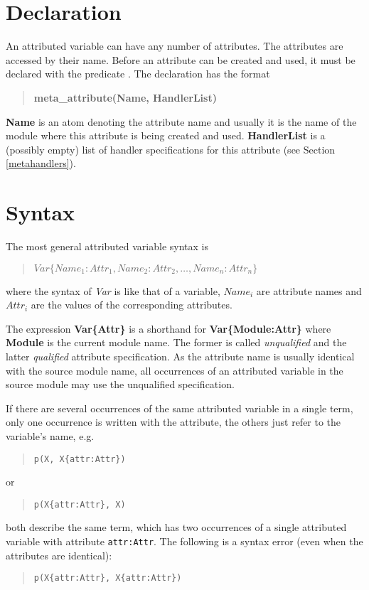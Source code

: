 \section{Declaration}
An attributed variable can have any number of attributes.
The attributes are accessed by their name.
Before an attribute can be created and used, it must be declared
with the predicate .
The declaration has the format
\begin{quote}
{\bf meta_attribute(Name, HandlerList)}
\end{quote}
{\bf Name} is an atom denoting the attribute name
and usually it is the name of the module where this attribute
is being created and used.
{\bf HandlerList} is a (possibly empty) list of handler specifications
for this attribute (see Section \ref{metahandlers}).

\section{Syntax}

{\samepage
The most general attributed variable syntax is
\begin{quote}
$Var\{Name_1:Attr_1, Name_2:Attr_2, \ldots, Name_n:Attr_n\}$
\end{quote}
where the syntax of {\it Var} is like that of a variable,
{\it $Name_i$}
are attribute names and
{\it $Attr_i$}
are the values of the corresponding attributes.
}
The expression {\bf Var\{Attr\}} is a shorthand for {\bf Var\{Module:Attr\}}
where {\bf Module} is the current module name.
The former is called {\it unqualified} and the latter {\it qualified}
attribute specification.
As the attribute name is usually identical with the source module name,
all occurrences of an attributed variable in the source module may use the unqualified
specification.

If there are several occurrences of the same attributed variable in a single term,
only one occurrence is written with the attribute,
the others just refer to the variable's name,
e.g.
\begin{quote}\begin{verbatim}
p(X, X{attr:Attr})
\end{verbatim}\end{quote}
or
\begin{quote}\begin{verbatim}
p(X{attr:Attr}, X)
\end{verbatim}\end{quote}
both describe the same term, which has two occurrences of a single attributed variable
with attribute {\tt attr:Attr}.
The following is a syntax error (even when the attributes are identical):
\begin{quote}\begin{verbatim}
p(X{attr:Attr}, X{attr:Attr})
\end{verbatim}\end{quote}


